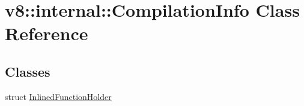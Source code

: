 \hypertarget{classv8_1_1internal_1_1_compilation_info}{}\section{v8\+:\+:internal\+:\+:Compilation\+Info Class Reference}
\label{classv8_1_1internal_1_1_compilation_info}
\subsection*{Classes}
\begin{DoxyCompactItemize}
\item 
struct \hyperlink{structv8_1_1internal_1_1_compilation_info_1_1_inlined_function_holder}{Inlined\+Function\+Holder}
\end{DoxyCompactItemize}
